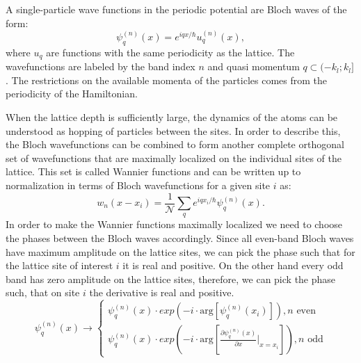A single-particle wave functions in the periodic potential are Bloch waves of the form:
\begin{equation}
\psi^{(n)}_q (x) = e^{iqx/\hbar} u_q^{(n)} (x),
\end{equation}
where $u_q$ are functions with the same periodicity as the lattice. The wavefunctions are labeled by the band index $n$ and quasi momentum $q \subset (-k_l; k_l]$. The restrictions on the available momenta of the particles comes from the periodicity of the Hamiltonian.

When the lattice depth is sufficiently large, the dynamics of the atoms can be understood as hopping of particles between the sites. In order to describe this, the Bloch wavefunctions can be combined to form another complete orthogonal set of wavefunctions that are maximally localized on the individual sites of the lattice. This set is called Wannier functions and can be written up to normalization in terms of Bloch wavefunctions for a given site $i$ as:
\begin{equation}
w_n(x-x_i) = \frac{1}{\mathcal{N}} \sum_q e^{iqx_i/\hbar} \psi_q^{(n)}(x).
\end{equation}
In order to make the Wannier functions maximally localized we need to choose the phases between the Bloch waves accordingly. Since all even-band Bloch waves have maximum amplitude on the lattice sites, we can pick the phase such that for the lattice site of interest $i$ it is real and positive. On the other hand every odd band has zero amplitude on the lattice sites, therefore, we can pick the phase such, that on site $i$ the derivative is real and positive.
\begin{equation}
\psi_q^{(n)}(x) \rightarrow
\begin{cases}
\psi_q^{(n)}(x) \cdot exp(-i \cdot \textrm{arg}[\psi_q^{(n)}(x_i)]), n \textrm{ even}\\
\psi_q^{(n)}(x) \cdot exp(-i \cdot  \textrm{arg}[\frac{\partial \psi_q^{(n)}(x)}{\partial x}|_{x=x_i}]), n \textrm{ odd}
\end{cases}
\end{equation}

